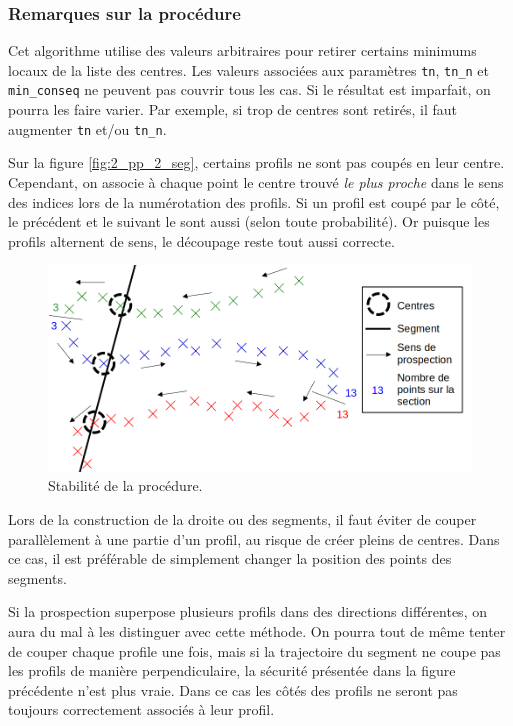 \documentclass[12pt]{article}
\begin{document}
    \subsubsection{Remarques sur la procédure}

    Cet algorithme utilise des valeurs arbitraires pour retirer certains minimums locaux de la liste des centres. Les valeurs associées aux paramètres \texttt{tn}, \texttt{tn\_n} et \texttt{min\_conseq} ne peuvent pas couvrir tous les cas. Si le résultat est imparfait, on pourra les faire varier. Par exemple, si trop de centres sont retirés, il faut augmenter \texttt{tn} et/ou \texttt{tn\_n}.

    Sur la figure \ref{fig:2_pp_2_seg}, certains profils ne sont pas coupés en leur centre. Cependant, on associe à chaque point le centre trouvé \textit{le plus proche} dans le sens des indices lors de la numérotation des profils. Si un profil est coupé par le côté, le précédent et le suivant le sont aussi (selon toute probabilité). Or puisque les profils alternent de sens, le découpage reste tout aussi correcte.

    \begin{figure}[ht!]
        \centering
        \includegraphics[width=\textwidth]{Images/PseudoProf_sch.png}  
        \caption{Stabilité de la procédure.}
    \end{figure}

    Lors de la construction de la droite ou des segments, il faut éviter de couper parallèlement à une partie d'un profil, au risque de créer pleins de centres. Dans ce cas, il est préférable de simplement changer la position des points des segments.

    Si la prospection superpose plusieurs profils dans des directions différentes, on aura du mal à les distinguer avec cette méthode. On pourra tout de même tenter de couper chaque profile une fois, mais si la trajectoire du segment ne coupe pas les profils de manière perpendiculaire, la sécurité présentée dans la figure précédente n'est plus vraie. Dans ce cas les côtés des profils ne seront pas toujours correctement associés à leur profil.
    
\end{document}
